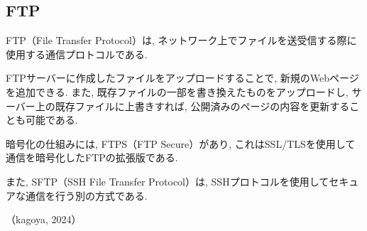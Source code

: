 \documentclass{ltjsarticle} %
\begin{document}
\subsection{FTP}
FTP（File Transfer Protocol）は, ネットワーク上でファイルを送受信する際に使用する通信プロトコルである. 

FTPサーバーに作成したファイルをアップロードすることで, 新規のWebページを追加できる. 
また, 既存ファイルの一部を書き換えたものをアップロードし, サーバー上の既存ファイルに上書きすれば, 公開済みのページの内容を更新することも可能である. 

\vspace{0.5cm}

暗号化の仕組みには, FTPS（FTP Secure）があり, これはSSL/TLSを使用して通信を暗号化したFTPの拡張版である. 

また, SFTP（SSH File Transfer Protocol）は, SSHプロトコルを使用してセキュアな通信を行う別の方式である. 

（kagoya, 2024）
\end{document}
